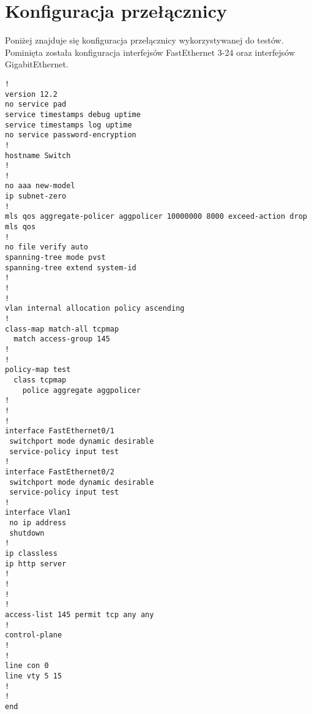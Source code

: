 \chapter{Konfiguracja przełącznicy}
\label{cha:dodatekA}

Poniżej znajduje się konfiguracja przełącznicy wykorzystywanej do testów. Pominięta została konfiguracja interfejsów FastEthernet 3-24 oraz interfejsów GigabitEthernet.

\begin{verbatim}
!
version 12.2
no service pad
service timestamps debug uptime
service timestamps log uptime
no service password-encryption
!
hostname Switch
!
!
no aaa new-model
ip subnet-zero
!
mls qos aggregate-policer aggpolicer 10000000 8000 exceed-action drop
mls qos
!
no file verify auto
spanning-tree mode pvst
spanning-tree extend system-id
!
!
!
vlan internal allocation policy ascending
!
class-map match-all tcpmap
  match access-group 145
!
!
policy-map test
  class tcpmap
    police aggregate aggpolicer
!
!
!
interface FastEthernet0/1
 switchport mode dynamic desirable
 service-policy input test
!
interface FastEthernet0/2
 switchport mode dynamic desirable
 service-policy input test
!
interface Vlan1
 no ip address
 shutdown
!
ip classless
ip http server
!
!
!
!
access-list 145 permit tcp any any
!
control-plane
!
!
line con 0
line vty 5 15
!
!
end
\end{verbatim}